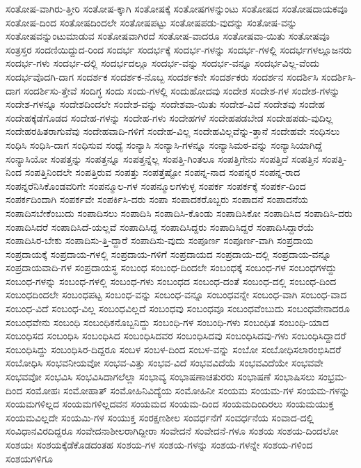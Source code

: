 {ಸಂತೋಷ-ವಾಗಿರು-ತ್ತೀರಿ
ಸಂತೋಷ-ಕ್ಕಾಗಿ
ಸಂತೋಷಕ್ಕೆ
ಸಂತೋಷಗಳನ್ನುಂಟು
ಸಂತೋಷದ
ಸಂತೋಷದಾಯಕವೂ
ಸಂತೋಷ-ದಿಂದ
ಸಂತೋಷದಿಂದಲೇ
ಸಂತೋಷಪಟ್ಟು
ಸಂತೋಷಪಡು-ವುದನ್ನು
ಸಂತೋಷ-ವನ್ನು
ಸಂತೋಷವನ್ನುಂಟುಮಾಡುವ
ಸಂತೋಷವಾಗಿರದೆ
ಸಂತೋಷ-ವಾದರೂ
ಸಂತೋಷವಾ-ಯಿತು
ಸಂತೋಷವೂ
ಸಂತ್ರಸ್ತರ
ಸಂದಣಿಯಿದ್ದುದ-ರಿಂದ
ಸಂದರ್ಭ
ಸಂದರ್ಭಕ್ಕೆ
ಸಂದರ್ಭ-ಗಳನ್ನು
ಸಂದರ್ಭ-ಗಳಲ್ಲಿ
ಸಂದರ್ಭಗಳಲ್ಲೂಜನರು
ಸಂದರ್ಭ-ಗಳು
ಸಂದರ್ಭ-ದಲ್ಲಿ
ಸಂದರ್ಭದಲ್ಲೂ
ಸಂದರ್ಭ-ವನ್ನು
ಸಂದರ್ಭ-ವನ್ನೂ
ಸಂದರ್ಭವಿಲ್ಲ-ವೆಂದು
ಸಂದರ್ಭವೊದಗಿ-ದಾಗ
ಸಂದರ್ಶಕ
ಸಂದರ್ಶಕ-ನೊಬ್ಬ
ಸಂದರ್ಶಕನೇ
ಸಂದರ್ಶಕರು
ಸಂದರ್ಶನ
ಸಂದರ್ಶಿಸಿ
ಸಂದರ್ಶಿಸಿ-ದಾಗ
ಸಂದರ್ಶಿಸು-ತ್ತೇವೆ
ಸಂದಿಗ್ಧ
ಸಂದು
ಸಂದು-ಗಳಲ್ಲಿ
ಸಂದುಹೋದವು
ಸಂದೇಶ
ಸಂದೇಶ-ಗಳ
ಸಂದೇಶ-ಗಳನ್ನು
ಸಂದೇಶ-ಗಳನ್ನೂ
ಸಂದೇಶದಿಂದಲೇ
ಸಂದೇಶ-ವನ್ನು
ಸಂದೇಶವಾ-ಯಿತು
ಸಂದೇಶ-ವಿದೆ
ಸಂದೇಶವು
ಸಂದೇಹ
ಸಂದೇಹಕ್ಕೆಡೆಗೊಡದ
ಸಂದೇಹ-ಗಳನ್ನು
ಸಂದೇಹ-ಗಳು
ಸಂದೇಹಗಳೆ
ಸಂದೇಹಪಡಬೇಡ
ಸಂದೇಹಪಡು-ವುದಿಲ್ಲ
ಸಂದೇಹರಹಿತರಾಗುವೆವು
ಸಂದೇಹವಾದಿ-ಗಳಿಗೆ
ಸಂದೇಹ-ವಿಲ್ಲ
ಸಂದೇಹವಿಲ್ಲವೆನ್ನು-ತ್ತಾನೆ
ಸಂದೇಹವೇ
ಸಂಧಿಸಲು
ಸಂಧಿಸಿ
ಸಂಧಿಸಿ-ದಾಗ
ಸಂಧಿಸುವ
ಸಂಧ್ಯೆ
ಸಂನ್ಯಾಸಿ
ಸಂನ್ಯಾಸಿ-ಗಳನ್ನೂ
ಸಂನ್ಯಾಸಿಮಠ-ವನ್ನು
ಸಂನ್ಯಾಸಿಯಾಗಿದ್ದೆ
ಸಂನ್ಯಾಸಿಯೋ
ಸಂಪತ್ತನ್ನು
ಸಂಪತ್ತನ್ನೂ
ಸಂಪತ್ತನ್ನೆಲ್ಲ
ಸಂಪತ್ತಿ-ಗಿಂತಲೂ
ಸಂಪತ್ತಿಗೇನು
ಸಂಪತ್ತಿದೆ
ಸಂಪತ್ತಿನ
ಸಂಪತ್ತಿ-ನಿಂದ
ಸಂಪತ್ತಿನಿಂದಲೇ
ಸಂಪತ್ತಿರುವ
ಸಂಪತ್ತು
ಸಂಪತ್ತೆಷ್ಟೋ
ಸಂಪನ್ನ-ನಾದ
ಸಂಪನ್ನರ
ಸಂಪನ್ನ-ರಾದ
ಸಂಪನ್ನರೆನಿಸಿಕೊಂಡವರಿಗೇ
ಸಂಪನ್ಮೂಲ-ಗಳ
ಸಂಪನ್ಮೂಲಗಳುಳ್ಳ
ಸಂಪರ್ಕ
ಸಂಪರ್ಕಕ್ಕೆ
ಸಂಪರ್ಕ-ದಿಂದ
ಸಂಪರ್ಕದಿಂದಾಗಿ
ಸಂಪರ್ಕವೇ
ಸಂಪರ್ಕಿಸಿ-ದರು
ಸಂಪಾ
ಸಂಪಾದಕರೊಬ್ಬರು
ಸಂಪಾದನೆ
ಸಂಪಾದನೆಯ
ಸಂಪಾದಿಸಬೇಕೆಂಬುದು
ಸಂಪಾದಿಸಲು
ಸಂಪಾದಿಸಿ
ಸಂಪಾದಿಸಿ-ಕೊಂಡು
ಸಂಪಾದಿಸಿಕೋ
ಸಂಪಾದಿಸಿದ
ಸಂಪಾದಿಸಿ-ದರು
ಸಂಪಾದಿಸಿದರೆ
ಸಂಪಾದಿಸಿದೆ-ಯಲ್ಲವೆ
ಸಂಪಾದಿಸಿದ್ದ
ಸಂಪಾದಿಸಿದ್ದರು
ಸಂಪಾದಿಸಿದ್ದರೆ
ಸಂಪಾದಿಸಿದ್ದಾರೆಯೆ
ಸಂಪಾದಿಸಿರ-ಬೇಕು
ಸಂಪಾದಿಸು-ತ್ತಿ-ದ್ದಾರೆ
ಸಂಪಾದಿಸು-ವುದು
ಸಂಪೂರ್ಣ
ಸಂಪೂರ್ಣ-ವಾಗಿ
ಸಂಪ್ರದಾಯ
ಸಂಪ್ರದಾಯಕ್ಕೆ
ಸಂಪ್ರದಾಯ-ಗಳಲ್ಲಿ
ಸಂಪ್ರದಾಯ-ಗಳಿಗೆ
ಸಂಪ್ರದಾಯದ
ಸಂಪ್ರದಾಯ-ದಲ್ಲಿ
ಸಂಪ್ರದಾಯ-ವನ್ನೂ
ಸಂಪ್ರದಾಯವಾದಿ-ಗಳ
ಸಂಪ್ರದಾಯಸ್ಥ
ಸಂಬಂಧ
ಸಂಬಂಧ-ದಿಂದಲೇ
ಸಂಬಂಧಕ್ಕೆ
ಸಂಬಂಧ-ಗಳ
ಸಂಬಂಧಗಳದ್ದು
ಸಂಬಂಧ-ಗಳನ್ನು
ಸಂಬಂಧ-ಗಳಲ್ಲಿ
ಸಂಬಂಧ-ಗಳು
ಸಂಬಂಧದ
ಸಂಬಂಧ-ದಂತೆ
ಸಂಬಂಧ-ದಲ್ಲಿ
ಸಂಬಂಧ-ದಿಂದ
ಸಂಬಂಧದಿಂದಲೇ
ಸಂಬಂಧಪಟ್ಟ
ಸಂಬಂಧ-ವನ್ನು
ಸಂಬಂಧ-ವನ್ನೂ
ಸಂಬಂಧವನ್ನೇ
ಸಂಬಂಧ-ವಾಗಿ
ಸಂಬಂಧ-ವಾದ
ಸಂಬಂಧ-ವಿದೆ
ಸಂಬಂಧ-ವಿಲ್ಲ
ಸಂಬಂಧವಿಲ್ಲದೆ
ಸಂಬಂಧವು
ಸಂಬಂಧವೂ
ಸಂಬಂಧವೆಂಬುದು
ಸಂಬಂಧವೇನಾದರೂ
ಸಂಬಂಧವೇನು
ಸಂಬಂಧಿ
ಸಂಬಂಧಿಕನೊಬ್ಬನಿದ್ದು
ಸಂಬಂಧಿ-ಗಳ
ಸಂಬಂಧಿ-ಗಳು
ಸಂಬಂಧಿತ
ಸಂಬಂಧಿ-ಯಾದ
ಸಂಬಂಧಿಸದ
ಸಂಬಂಧಿಸಿ
ಸಂಬಂಧಿಸಿದ
ಸಂಬಂಧಿಸಿದವರ
ಸಂಬಂಧಿಸಿದವು
ಸಂಬಂಧಿಸಿದವು-ಗಳು
ಸಂಬಂಧಿಸಿದ್ದಾದರೆ
ಸಂಬಂಧಿಸಿದ್ದು
ಸಂಬಂಧಿಸಿರ-ದಿದ್ದರೂ
ಸಂಬಳ
ಸಂಬಳ-ದಿಂದ
ಸಂಬಳ-ವನ್ನು
ಸಂಬೋ
ಸಂಬೋಧಿಸಲಾರಂಭಿಸಿದರೆ
ಸಂಬೋಧಿಸಿ
ಸಂಭವನೀಯವೋ
ಸಂಭವ-ವಿತ್ತು
ಸಂಭವ-ವಿದೆ
ಸಂಭವವಿದೆಯೆ
ಸಂಭವವಿದೆಯೇ
ಸಂಭವವೇ
ಸಂಭವವೋ
ಸಂಭವಿಸಿ
ಸಂಭವಿಸಿದಾಗಲೆಲ್ಲಾ
ಸಂಭಾವ್ಯ
ಸಂಭಾಷಣಾಚತುರರು
ಸಂಭಾಷಣೆ
ಸಂಭಾಷಿಸಲು
ಸಂಭ್ರಮ-ದಿಂದ
ಸಂಮೋಹಃ
ಸಂಮೋಹಾತ್
ಸಂಮೋಹಿನಿವಿದ್ಯೆಯ
ಸಂಮೋಹಿನೀ
ಸಂಯಮ
ಸಂಯಮ-ಗಳ
ಸಂಯಮ-ಗಳನ್ನು
ಸಂಯಮಗಳಿಲ್ಲದ
ಸಂಯಮಗಳಿಲ್ಲದವನ
ಸಂಯಮದ
ಸಂಯಮ-ದಿಂದ
ಸಂಯಮದಿಂದಿರಲು
ಸಂಯಮಯುಕ್ತ
ಸಂಯಮವಿಲ್ಲದೇ
ಸಂಯಮಿ-ಗಳ
ಸಂಯುಕ್ತ
ಸಂರಕ್ಷಣಶೀಲ
ಸಂವರ್ಧನೆಗೆ
ಸಂವರ್ಧನೆಯ
ಸಂವಾದ-ದಲ್ಲಿ
ಸಂವಿಧಾನವಿರದಿದ್ದರೂ
ಸಂವೇದನಾಶೀಲರಾಗಿದ್ದೀರಾ
ಸಂವೇದನೆ
ಸಂವೇದನೆ-ಗಳೂ
ಸಂಶಯ
ಸಂಶಯ-ದಿಂದಲೋ
ಸಂಶಯಃ
ಸಂಶಯಕ್ಕೆಡೆಕೊಡದಂತಹ
ಸಂಶಯ-ಗಳ
ಸಂಶಯ-ಗಳನ್ನು
ಸಂಶಯ-ಗಳನ್ನೇ
ಸಂಶಯ-ಗಳಿಂದ
ಸಂಶಯಗಳಿಗೂ
}
